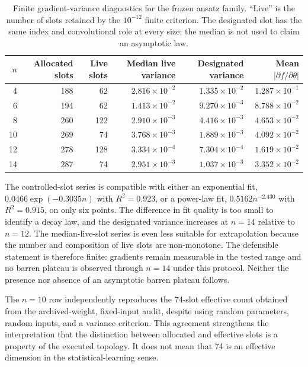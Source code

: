 \documentclass[conference]{IEEEtran}
\begin{document}
\begin{table}[!t]
\caption{Finite gradient-variance diagnostics for the frozen ansatz family. ``Live'' is the number of slots retained by the $10^{-12}$ finite criterion. The designated slot has the same index and convolutional role at every size; the median is not used to claim an asymptotic law.}
\label{tab:gradient}
\centering
\small
\begin{tabular}{@{}rrrrrr@{}}
\toprule
\textbf{$n$} & \textbf{Allocated slots} & \textbf{Live slots} & \textbf{Median live variance} & \textbf{Designated variance} & \textbf{Mean $|\partial f/\partial\theta|$} \\
\midrule
4 & 188 & 62 & $2.816\times10^{-2}$ & $1.335\times10^{-2}$ & $1.287\times10^{-1}$ \\
6 & 194 & 62 & $1.413\times10^{-2}$ & $9.270\times10^{-3}$ & $8.788\times10^{-2}$ \\
8 & 260 & 122 & $2.910\times10^{-3}$ & $4.416\times10^{-3}$ & $4.653\times10^{-2}$ \\
10 & 269 & 74 & $3.768\times10^{-3}$ & $1.889\times10^{-3}$ & $4.092\times10^{-2}$ \\
12 & 278 & 128 & $3.334\times10^{-4}$ & $7.304\times10^{-4}$ & $1.619\times10^{-2}$ \\
14 & 287 & 74 & $2.951\times10^{-3}$ & $1.037\times10^{-3}$ & $3.352\times10^{-2}$ \\
\bottomrule
\end{tabular}
\end{table}

The controlled-slot series is compatible with either an exponential fit,
$0.0466\exp(-0.3035n)$ with $R^2=0.923$, or a power-law fit,
$0.5162n^{-2.430}$ with $R^2=0.915$, on only six points. The difference in
fit quality is too small to identify a decay law, and the designated variance
increases at $n=14$ relative to $n=12$. The median-live-slot series is even
less suitable for extrapolation because the number and composition of live
slots are non-monotone. The defensible statement is therefore finite: gradients
remain measurable in the tested range and no barren plateau is observed through
$n=14$ under this protocol. Neither the presence nor absence of an asymptotic
barren plateau follows.

The $n=10$ row independently reproduces the 74-slot effective count obtained
from the archived-weight, fixed-input audit, despite using random parameters,
random inputs, and a variance criterion. This agreement strengthens the
interpretation that the distinction between allocated and effective slots is a
property of the executed topology. It does not mean that 74 is an effective
dimension in the statistical-learning sense.
\end{document}

